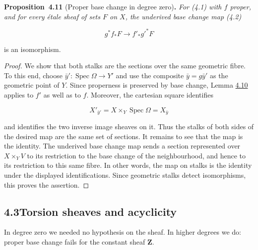 \documentclass[11pt]{article}
\newenvironment{bpstatement}[2]{\par\addvspace{0.6\baselineskip}\noindent\textbf{#1}#2\textbf{.}\enspace\ignorespaces}
  {\par\addvspace{0.4\baselineskip}}
\newenvironment{bpstatementit}[2]{\begin{bpstatement}{#1}{#2}\itshape\ignorespaces}{\end{bpstatement}}
\begin{document}
\label{bp30}%
\begin{bpstatementit}{Proposition~4.11}{ (Proper base change in degree zero)}
For (4.1) with \(f\) proper, and for every étale sheaf of sets \(F\) on \(X\), the underived base change map (4.2)

\[
g^*f_*F\longrightarrow f'_*g'^*F
\]

is an isomorphism.
\end{bpstatementit}

\begin{proof}[{Proof}]\label{bp31}%
We show that both stalks are the sections over the same geometric fibre. To this end, choose \(\bar y':\operatorname{Spec}\Omega\to Y'\) and use the composite \(\bar y=g\bar y'\) as the geometric point of \(Y\). Since properness is preserved by base change, Lemma \hyperref[bp28]{4.10} applies to \(f'\) as well as to \(f\). Moreover, the cartesian square identifies

\[
X'_{\bar y'}=X\times_Y\operatorname{Spec}\Omega=X_{\bar y}
\]

and identifies the two inverse image sheaves on it. Thus the stalks of both sides of the desired map are the same set of sections. It remains to see that the map is the identity. The underived base change map sends a section represented over \(X\times_YV\) to its restriction to the base change of the neighbourhood, and hence to its restriction to this same fibre. In other words, the map on stalks is the identity under the displayed identifications. Since geometric stalks detect isomorphisms, this proves the assertion.
\end{proof}


\subsection*{\texorpdfstring{4.3\quad Torsion sheaves and acyclicity}{4.3 Torsion sheaves and acyclicity}}
\label{bp32}%
\label{bp33}%
In degree zero we needed no hypothesis on the sheaf. In higher degrees we do: proper base change fails for the constant sheaf \(\mathbf Z\).
\end{document}
